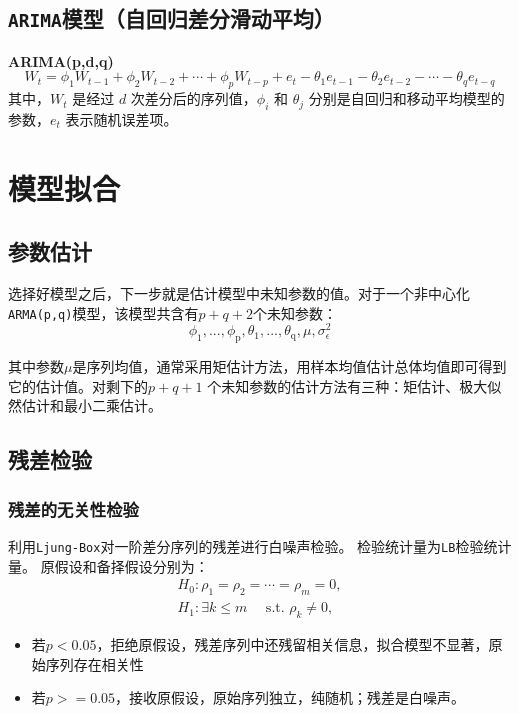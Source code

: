 \documentclass{article} %
\begin{document}
\subsection{\texttt{ARIMA}模型（自回归差分滑动平均）}
\textbf{ARIMA(p,d,q)}
\[
W_t=\phi_1W_{t-1}+\phi_2W_{t-2}+\cdots+\phi_pW_{t-p}+e_t-\theta_1e_{t-1}-\theta_2e_{t-2}-\cdots-\theta_qe_{t-q}
\]
其中，\(W_t\) 是经过 \(d\) 次差分后的序列值，\(\phi_i\) 和 \(\theta_j\) 分别是自回归和移动平均模型的参数，\(e_t\) 表示随机误差项。

\section{模型拟合}

\subsection{参数估计}
选择好模型之后，下一步就是估计模型中未知参数的值。对于一个非中心化\texttt{ARMA(p,q)}模型，该模型共含有\( p+q+2 \)个未知参数：\[\phi_1,...,\phi_\mathrm{p},\theta_1,...,\theta_\mathrm{q},\mu,\sigma_\epsilon^2\]

其中参数\(\mu\)是序列均值，通常采用矩估计方法，用样本均值估计总体均值即可得到它的估计值。对剩下的\( p + q + 1 \) 个未知参数的估计方法有三种：矩估计、极大似然估计和最小二乘估计。

\subsection{残差检验}

\subsubsection{残差的无关性检验}

利用\texttt{Ljung-Box}对一阶差分序列的残差进行白噪声检验。
检验统计量为\texttt{LB}检验统计量。
原假设和备择假设分别为：
\[
\begin{gathered}
H_0:\rho_1=\rho_2=\cdots=\rho_m=0, \\
H_1:\exists k\leq m \quad \text{ s.t. } \rho_k \neq 0,
\end{gathered}
\]

\begin{itemize}
  \item 若\(p<0.05\)，拒绝原假设，残差序列中还残留相关信息，拟合模型不显著，原始序列存在相关性
  \item 若\(p>=0.05\)，接收原假设，原始序列独立，纯随机；残差是白噪声。
\end{itemize}
\end{document}
